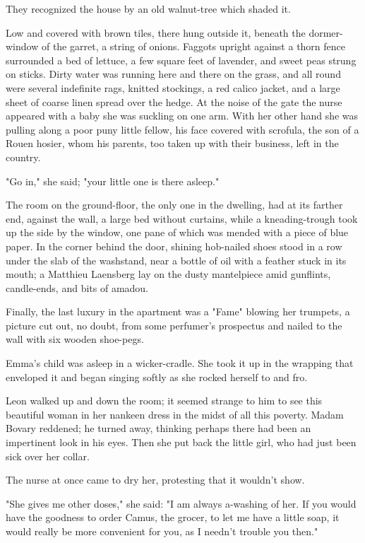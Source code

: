 \documentclass[11pt,twocolumn]{ltugboat}
\begin{document}
They recognized the house by an old walnut-tree which shaded it.

Low and covered with brown tiles, there hung outside it, beneath the
dormer-window of the garret, a string of onions. Faggots upright
against a thorn fence surrounded a bed of lettuce, a few square feet of
lavender, and sweet peas strung on sticks. Dirty water was running here
and there on the grass, and all round were several indefinite rags,
knitted stockings, a red calico jacket, and a large sheet of coarse
linen spread over the hedge. At the noise of the gate the nurse appeared
with a baby she was suckling on one arm. With her other hand she was
pulling along a poor puny little fellow, his face covered with scrofula,
the son of a Rouen hosier, whom his parents, too taken up with their
business, left in the country.

"Go in," she said; "your little one is there asleep."

The room on the ground-floor, the only one in the dwelling, had at its
farther end, against the wall, a large bed without curtains, while a
kneading-trough took up the side by the window, one pane of which
was mended with a piece of blue paper. In the corner behind the door,
shining hob-nailed shoes stood in a row under the slab of the washstand,
near a bottle of oil with a feather stuck in its mouth; a Matthieu
Laensberg lay on the dusty mantelpiece amid gunflints, candle-ends, and
bits of amadou.

Finally, the last luxury in the apartment was a "Fame" blowing her
trumpets, a picture cut out, no doubt, from some perfumer's prospectus
and nailed to the wall with six wooden shoe-pegs.

Emma's child was asleep in a wicker-cradle. She took it up in the
wrapping that enveloped it and began singing softly as she rocked
herself to and fro.

Leon walked up and down the room; it seemed strange to him to see this
beautiful woman in her nankeen dress in the midst of all this poverty.
Madam Bovary reddened; he turned away, thinking perhaps there had been
an impertinent look in his eyes. Then she put back the little girl, who
had just been sick over her collar.

The nurse at once came to dry her, protesting that it wouldn't show.

"She gives me other doses," she said: "I am always a-washing of her. If
you would have the goodness to order Camus, the grocer, to let me have
a little soap, it would really be more convenient for you, as I needn't
trouble you then."
\end{document}
